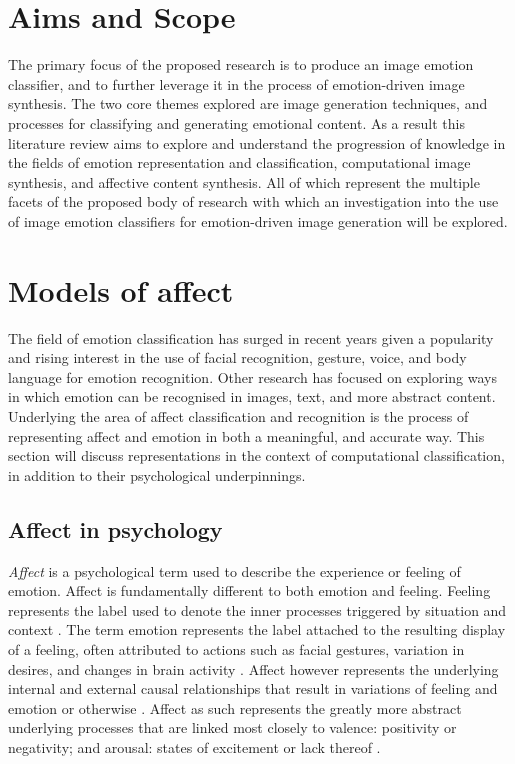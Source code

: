 \documentclass{article}
\begin{document}
\section{Aims and Scope}

The primary focus of the proposed research is to produce an image emotion classifier, and to further leverage it in the process of emotion-driven image synthesis.
The two core themes explored are image generation techniques, and processes for classifying and generating emotional content.
As a result this literature review aims to explore and understand the progression of knowledge in the fields of emotion representation and classification, computational image synthesis, and affective content synthesis.
All of which represent the multiple facets of the proposed body of research with which an investigation into the use of image emotion classifiers for emotion-driven image generation will be explored.


\section{Models of affect}

The field of emotion classification has surged in recent years given a popularity and rising interest in the use of facial recognition, gesture, voice, and body language for emotion recognition.
Other research has focused on exploring ways in which emotion can be recognised in images, text, and more abstract content.
Underlying the area of affect classification and recognition is the process of representing affect and emotion in both a meaningful, and accurate way.
This section will discuss representations in the context of computational classification, in addition to their psychological underpinnings.

\subsection{Affect in psychology}

\textit{Affect} is a psychological term used to describe the experience or feeling of emotion.
Affect is fundamentally different to both emotion and feeling.
Feeling represents the label used to denote the inner processes triggered by situation and context \citep{shouse2005feeling}.
The term emotion represents the label attached to the resulting display of a feeling, often attributed to actions such as facial gestures, variation in desires, and changes in brain activity \citep{sloman2001beyond}.
Affect however represents the underlying internal and external causal relationships that result in variations of feeling and emotion or otherwise \citep{russell2003core}.
Affect as such represents the greatly more abstract underlying processes that are linked most closely to valence: positivity or negativity; and arousal: states of excitement or lack thereof \citep{russell2003core}.
\end{document}
